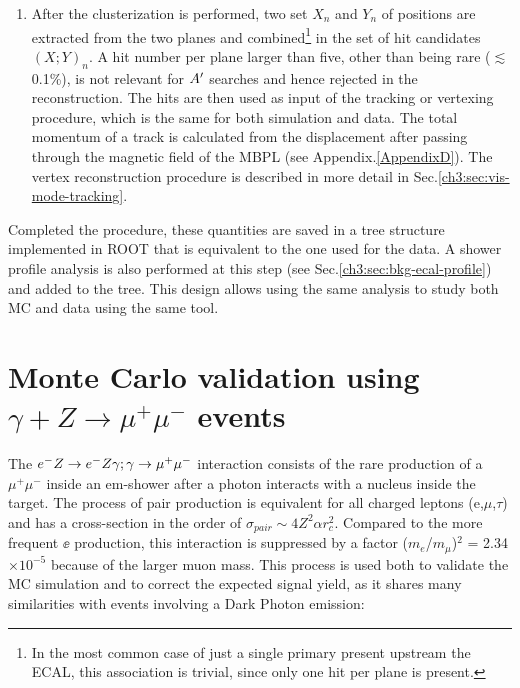 \begin{enumerate}
\item After the clusterization is performed, two set $X_n$ and $Y_n$ of positions are extracted from the two planes and combined\footnote{In the most common case of just a single primary present upstream the ECAL, this association is trivial, since only one hit per plane is present.} in the set of hit candidates $(X;Y)_n$. A hit number per plane larger than five, other than being rare ($\lesssim$0.1\%), is not relevant for $A'$ searches and hence rejected in the reconstruction. The hits are then used as input of the tracking or vertexing procedure, which is the same for both simulation and data. The total momentum of a track is calculated from the displacement after passing through the magnetic field of the MBPL (see Appendix.\ref{AppendixD}). The vertex reconstruction procedure is described in more detail in Sec.\ref{ch3:sec:vis-mode-tracking}.
\end{enumerate}

Completed the procedure, these quantities are saved in a tree structure implemented in ROOT \cite{root} that is equivalent to the one used for the data. A shower profile analysis is also performed at this step (see Sec.\ref{ch3:sec:bkg-ecal-profile}) and added to the tree. This design allows using the same analysis to study both MC and data using the same tool.

\section{Monte Carlo validation using $\gamma + Z \rightarrow \mu^+ \mu^-$ events}
\label{ch3:sec:dimuons}

The $e^- Z \to e^- Z \gamma; \gamma \to \mu^+ \mu^-$ interaction consists of the rare production of a $\mu^+\mu^-$ inside an em-shower after a photon interacts with a nucleus inside the target. The process of pair production is equivalent for all charged leptons (e,$\mu$,$\tau$) and has a cross-section in the order of $\sigma_{pair} \sim 4Z^2\alpha r^2_c$. Compared to the more frequent $\ee$ production, this interaction is suppressed by a factor ($m_e$/$m_{\mu}$)$^2$ = 2.34 $\times 10^{-5}$ because of the larger muon mass. This process is used both to validate the MC simulation and to correct the expected signal yield, as it shares many similarities with events involving a Dark Photon emission:

